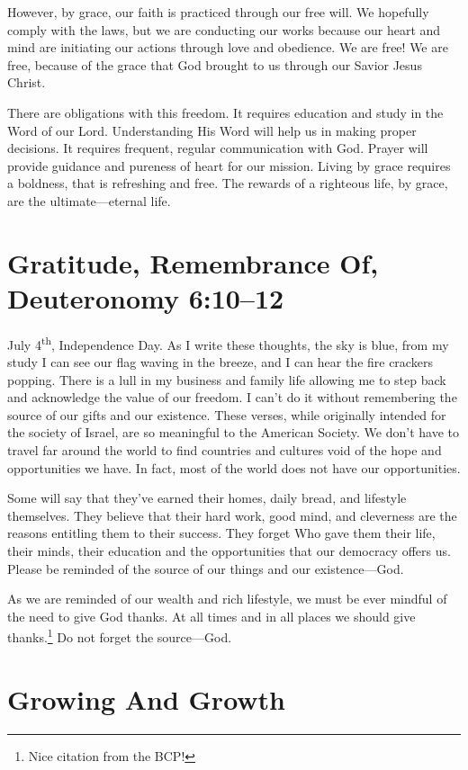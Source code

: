 \documentclass[12pt]{memoir}
\begin{document}
However, by grace, our faith is practiced through our free will. We
hopefully comply with the laws, but we are conducting our works because
our heart and mind are initiating our actions through love and obedience.
We are free!
We are free, because of the grace that God brought to us through our Savior Jesus Christ.

There are obligations with this freedom. It requires education and
study in the Word of our Lord. Understanding His Word will help us
in making proper decisions. It requires frequent, regular communication
with God. Prayer will provide guidance and pureness of heart for our
mission. Living by grace requires a boldness, that is refreshing and
free. The rewards of a righteous life, by grace, are the ultimate---eternal
life.

\section[Gratitude, Remembrance Of]{Gratitude, Remembrance Of, Deuteronomy 6:10--12}

July 4\textsuperscript{th}, Independence Day. As I write these thoughts,
the sky is blue, from my study I can see our flag waving in the breeze,
and I can hear the fire crackers popping. There is a lull in my business
and family life allowing me to step back and acknowledge the
value of our freedom. I can't do it without remembering the source
of our gifts and our existence. These verses, while originally intended
for the society of Israel, are so meaningful to the American Society.
We don't have to travel far around the world to find countries and
cultures void of the hope and opportunities we have. In fact, most
of the world does not have our opportunities. 

Some will say that they've earned their homes, daily bread,
and lifestyle themselves. They believe that their hard work, good
mind, and cleverness are the reasons entitling them to their success.
They forget Who gave them their life, their minds, their education
and the opportunities that our democracy offers us. Please be reminded
of the source of our things and our existence---God. 

As we are reminded of our wealth and rich lifestyle, we must be ever mindful of the need to give God thanks. At all times and in all places we should give thanks.\footnote{Nice citation from the BCP!} Do not forget the source---God. 

\section{Growing And Growth}
\end{document}
